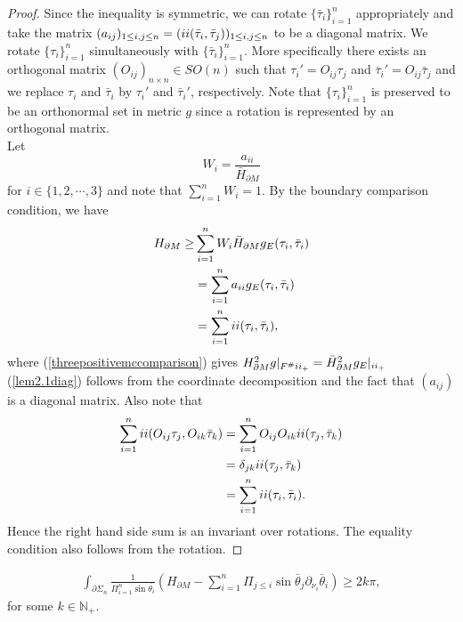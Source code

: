 \documentclass[10pt,a4paper]{amsart}
\newcommand{\RN}[1]{%
  \textup{\uppercase\expandafter{\romannumeral#1}}%
}
\begin{document}
\begin{prop}
\begin{proof}
   Since the inequality is symmetric, we can rotate $\{\bar{\tau}_i\}_{i=1}^n$ appropriately and take the matrix $(a_{ij})_{1 \le i,j \le n} = (\RN{2}(\bar{\tau}_i,\bar{\tau}_j))_{1 \le i,j \le n}$ to be a diagonal matrix. We rotate $\{\tau_i\}_{i=1}^n$ simultaneously with $\{\bar{\tau}_i\}_{i=1}^n$. More specifically there exists an orthogonal matrix $(O_{ij})_{n\times n}\in SO(n)$ such that $\tau_{i}' = O_{ij}\tau_{j}$ and $\bar{\tau}_{i}' = O_{ij} \bar{\tau}_{j}$ and we replace $\tau_{i}$ and $\bar{\tau}_{i}$ by $\tau_{i}'$ and $\bar{\tau}_{i}'$, respectively. Note that $\{\tau_i\}_{i=1}^n$ is preserved to be an orthonormal set in metric $g$ since a rotation is represented by an orthogonal matrix.
 \\
        Let
    \[
    W_i=\frac{a_{ii}}{\bar{H}_{\partial M}}
    \]
    for $i\in\{1,2,\cdots,3\}$ and note that $\sum_{i=1}^nW_i=1$. By the boundary comparison condition, we have
\begin{align}
  \label{threepositivemccomparison} H_{\partial M}\geq& \sum_{i=1}^nW_i\bar{H}_{\partial M} g_E(\tau_i,\bar{\tau}_{i}) \\
  \nonumber &= \sum_{i=1}^na_{ii} g_E(\tau_i,\bar{\tau}_{i})\\
    &=\sum_{i=1}^n\RN{2}(\tau_i,\bar{\tau}_i) \label{lem2.1diag},
    \end{align}
where (\ref{threepositivemccomparison}) gives $H_{\partial M}^{2} g|_{F^{\#}\RN{2}_{+}} = \bar{H}_{\partial M}^{2} g_{E}|_{\RN{2}_{+}}$ (\ref{lem2.1diag}) follows from the coordinate decomposition and the fact that $(a_{ij})$ is a diagonal matrix.
Also note that
\begin{align*}
    \sum_{i=1}^n\RN{2}(O_{ij}\tau_j,O_{ik}\bar{\tau}_k)&= \sum_{i=1}^nO_{ij}O_{ik}\RN{2}(\tau_j,\bar{\tau}_k) \\ &= \delta_{jk} \RN{2}(\tau_j,\bar{\tau}_k) \\ &= \sum_{i=1}^n\RN{2}(\tau_i,\bar{\tau}_i).
\end{align*}
Hence the right hand side sum is an invariant over rotations. The equality condition also follows from the rotation.
\end{proof}

\end{prop}

\begin{prop} \label{prop: winding number}
\begin{align}
    \int_{\partial\Sigma_n}\frac{1}{\Pi_{i=1}^n\sin\bar{\theta_i}}\left(H_{\partial M}-\sum_{i=1}^n\Pi_{j\leq i}\sin\bar{\theta}_j\partial_{\nu_i}\bar{\theta}_i\right)\geq 2k\pi,
    \end{align}
    for some $k\in\mathbb N_+$.
\end{prop}
\end{document}
